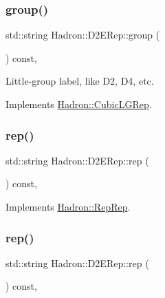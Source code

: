 \subsubsection{\texorpdfstring{group()}{group()}\hspace{0.1cm}{\footnotesize\ttfamily [3/3]}}
{\footnotesize\ttfamily std\+::string Hadron\+::\+D2\+E\+Rep\+::group (\begin{DoxyParamCaption}{ }\end{DoxyParamCaption}) const\hspace{0.3cm}{\ttfamily [inline]}, {\ttfamily [virtual]}}

Little-\/group label, like D2, D4, etc. 

Implements \mbox{\hyperlink{structHadron_1_1CubicLGRep_a9bdb14b519a611d21379ed96a3a9eb41}{Hadron\+::\+Cubic\+L\+G\+Rep}}.

\mbox{\label{structHadron_1_1D2ERep_a5fbd82820d3cde321d9208b7208873fb}} 
\subsubsection{\texorpdfstring{rep()}{rep()}\hspace{0.1cm}{\footnotesize\ttfamily [1/3]}}
{\footnotesize\ttfamily std\+::string Hadron\+::\+D2\+E\+Rep\+::rep (\begin{DoxyParamCaption}{ }\end{DoxyParamCaption}) const\hspace{0.3cm}{\ttfamily [inline]}, {\ttfamily [virtual]}}



Implements \mbox{\hyperlink{structHadron_1_1RepRep_ab3213025f6de249f7095892109575fde}{Hadron\+::\+Rep\+Rep}}.

\mbox{\label{structHadron_1_1D2ERep_a5fbd82820d3cde321d9208b7208873fb}} 
\subsubsection{\texorpdfstring{rep()}{rep()}\hspace{0.1cm}{\footnotesize\ttfamily [2/3]}}
{\footnotesize\ttfamily std\+::string Hadron\+::\+D2\+E\+Rep\+::rep (\begin{DoxyParamCaption}{ }\end{DoxyParamCaption}) const\hspace{0.3cm}{\ttfamily [inline]}, {\ttfamily [virtual]}}



